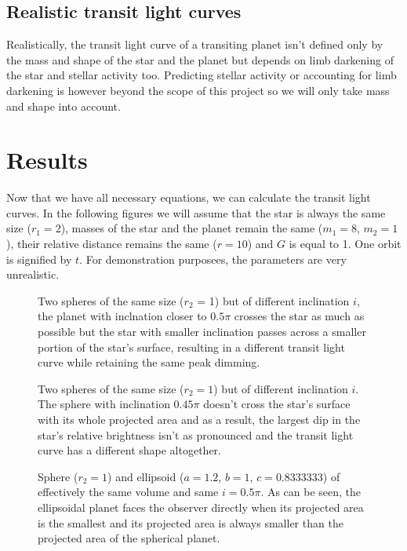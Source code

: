 \documentclass[10pt]{article}
\numberwithin{equation}{subsection}
\begin{document}
\subsection{Realistic transit light curves}
Realistically, the transit light curve of a transiting planet isn't defined only by
the mass and shape of the star and the planet but depends on limb darkening of the star
and stellar activity too. Predicting stellar activity or accounting for limb darkening
is however beyond the scope of this project so we will only take mass and shape into
account.
\section{Results}
Now that we have all necessary equations, we can calculate the transit light curves.
In the following figures we will assume that the star is always the same size ($r_1 = 2$),
masses of the star and the planet remain the same ($m_1 = 8$, $m_2 = 1$), their relative
distance remains the same ($r = 10$) and $G$ is equal to 1. One orbit is signified by $t$.
For demonstration purposees, the parameters are very unrealistic.
\begin{figure}[H]
  \centering
  
  \caption{Two spheres of the same size ($r_2$ = 1) but of different inclination $i$,
  the planet with inclnation closer to $0.5\pi$ crosses the star as much as possible
  but the star with smaller inclination passes across a smaller portion of the star's
  surface, resulting in a different transit light curve while retaining the same
  peak dimming.}
\end{figure}
\begin{figure}[H]
  \centering
  
  \caption{Two spheres of the same size ($r_2=1$) but of different inclination $i$.
  The sphere with inclination $0.45\pi$ doesn't cross the star's surface with its
  whole projected area and as a result, the largest dip in the star's relative brightness
  isn't as pronounced and the transit light curve has a different shape altogether.}
\end{figure}
\begin{figure}[H]
  \centering
  
  \caption{Sphere ($r_2=1$) and ellipsoid ($a=1.2$, $b=1$, $c=0.8333333$) of effectively
  the same volume and same $i=0.5\pi$. As can be seen, the ellipsoidal planet faces the
  observer directly when its projected area is the smallest and its projected area is
  always smaller than the projected area of the spherical planet.}
\end{figure}
\end{document}
